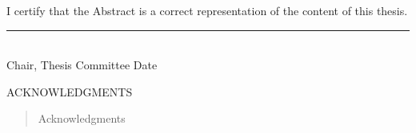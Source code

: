 \documentclass[12pt,oneside]{sfsuthesis}
\theoremstyle{plain} %
\theoremstyle{definition}  %
\theoremstyle{remark}  %
\begin{document}
\hspace*{\fill}

\noindent
I certify that the Abstract is a correct representation of the content of this thesis.

\vspace{.5in} 

\hrule{\hspace{3.75in}} \\[-10pt]
Chair, Thesis Committee 
\hspace{2.5in}
Date
\doublespacing
\newpage
\[ \]
\vspace{-1.8in}
\begin{center}{ACKNOWLEDGMENTS}\end{center}

\vspace{.5in}
\begin{quote}
\noindent
Acknowledgments
\end{quote}

\renewcommand{\contentsname}{\vspace{-1.7in} \begin{center} \normalsize \rm TABLE OF CONTENTS \end{center}}
\renewcommand{\listfigurename}{\vspace{-1.7in} \begin{center} \normalsize \rm LIST OF FIGURES \end{center}}
\renewcommand{\listtablename}{\vspace{-1.7in} \begin{center} \normalsize \rm LIST OF TABLES \end{center}}
\renewcommand{\cftchapfont}{\normalfont}
\renewcommand{\cftchappagefont}{\normalfont}
\renewcommand{\cftchapleader}{\cftdotfill{\cftdotsep}} %
\renewcommand{\cftsecfont}{\normalfont}
\renewcommand{\cftsecpagefont}{\normalfont}
\renewcommand{\cftsecleader}{\cftdotfill{\cftdotsep}}

\newpage \tableofcontents 
\newpage \listoftables %
\newpage \listoffigures %

\newpage
\pagestyle{myheadings}
\setcounter{page}{1}
\end{document}
